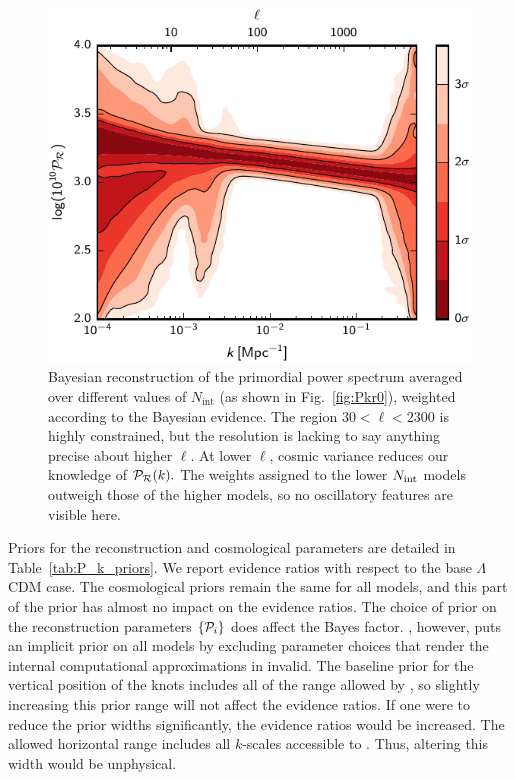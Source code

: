 \begin{figure}
\begin{center}
  \includegraphics[width=\textwidth]{chapter_pps_reconstruction/figures/single}
\end{center}
\caption{
Bayesian reconstruction of the primordial power spectrum averaged over different values of $N_\mathrm{int}$
(as shown in Fig.~\protect\ref{fig:Pkr0}), weighted according to the Bayesian evidence.
The region ${30<\ell<2300}$ is highly constrained, but the resolution is lacking to say anything precise 
about higher $\ell$. At lower $\ell$, cosmic variance reduces our knowledge of $\mathcal{P}_\mathcal{R}(k).$
The weights assigned to the lower $N_\mathrm{int}$ models outweigh those of the higher models, so no oscillatory 
features are visible here.
\label{fig:full_bayes_knots}}
\end{figure}



Priors for the reconstruction and cosmological parameters are detailed in Table~\ref{tab:P_k_priors}.
We report evidence ratios with respect to the base $\Lambda$CDM case. The cosmological priors remain the
same for all models, and this part of the prior has almost no impact on the evidence ratios.
The choice of prior on the reconstruction parameters
$\{\mathcal{P}_{i}\}$ does affect the Bayes factor. \CosmoMC{}, however, puts an implicit prior on all models by excluding
parameter choices that render the internal computational approximations in \CAMB{} invalid.
The baseline prior for the vertical position of the knots includes all
of the range allowed by \CosmoMC{}, so slightly increasing this prior range will not affect the evidence ratios. If
one were to reduce the prior widths significantly, the evidence ratios would be increased.
The allowed horizontal range includes all $k$-scales accessible to \Planck. Thus, altering this
width would be unphysical.


